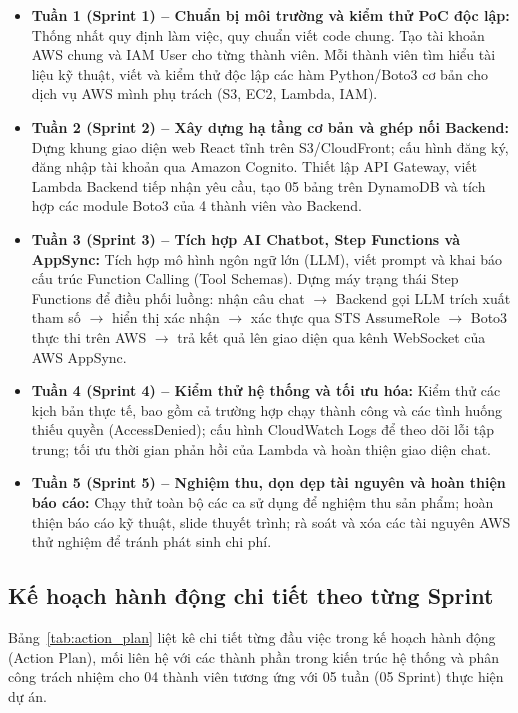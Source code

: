 \documentclass[a4paper,12pt]{article}
\begin{document}
\begin{itemize}
  \item \textbf{Tuần 1 (Sprint 1) -- Chuẩn bị môi trường và kiểm thử PoC độc lập:} Thống nhất quy định làm việc, quy chuẩn viết code chung. Tạo tài khoản AWS chung và IAM User cho từng thành viên. Mỗi thành viên tìm hiểu tài liệu kỹ thuật, viết và kiểm thử độc lập các hàm Python/Boto3 cơ bản cho dịch vụ AWS mình phụ trách (S3, EC2, Lambda, IAM).
  \item \textbf{Tuần 2 (Sprint 2) -- Xây dựng hạ tầng cơ bản và ghép nối Backend:} Dựng khung giao diện web React tĩnh trên S3/CloudFront; cấu hình đăng ký, đăng nhập tài khoản qua Amazon Cognito. Thiết lập API Gateway, viết Lambda Backend tiếp nhận yêu cầu, tạo 05 bảng trên DynamoDB và tích hợp các module Boto3 của 4 thành viên vào Backend.
  \item \textbf{Tuần 3 (Sprint 3) -- Tích hợp AI Chatbot, Step Functions và AppSync:} Tích hợp mô hình ngôn ngữ lớn (LLM), viết prompt và khai báo cấu trúc Function Calling (Tool Schemas). Dựng máy trạng thái Step Functions để điều phối luồng: nhận câu chat $\rightarrow$ Backend gọi LLM trích xuất tham số $\rightarrow$ hiển thị xác nhận $\rightarrow$ xác thực qua STS AssumeRole $\rightarrow$ Boto3 thực thi trên AWS $\rightarrow$ trả kết quả lên giao diện qua kênh WebSocket của AWS AppSync.
  \item \textbf{Tuần 4 (Sprint 4) -- Kiểm thử hệ thống và tối ưu hóa:} Kiểm thử các kịch bản thực tế, bao gồm cả trường hợp chạy thành công và các tình huống thiếu quyền (AccessDenied); cấu hình CloudWatch Logs để theo dõi lỗi tập trung; tối ưu thời gian phản hồi của Lambda và hoàn thiện giao diện chat.
  \item \textbf{Tuần 5 (Sprint 5) -- Nghiệm thu, dọn dẹp tài nguyên và hoàn thiện báo cáo:} Chạy thử toàn bộ các ca sử dụng để nghiệm thu sản phẩm; hoàn thiện báo cáo kỹ thuật, slide thuyết trình; rà soát và xóa các tài nguyên AWS thử nghiệm để tránh phát sinh chi phí.
\end{itemize}

\subsection{Kế hoạch hành động chi tiết theo từng Sprint}

Bảng~\ref{tab:action_plan} liệt kê chi tiết từng đầu việc trong kế hoạch hành động (Action Plan), mối liên hệ với các thành phần trong kiến trúc hệ thống và phân công trách nhiệm cho 04 thành viên tương ứng với 05 tuần (05 Sprint) thực hiện dự án.
\end{document}
